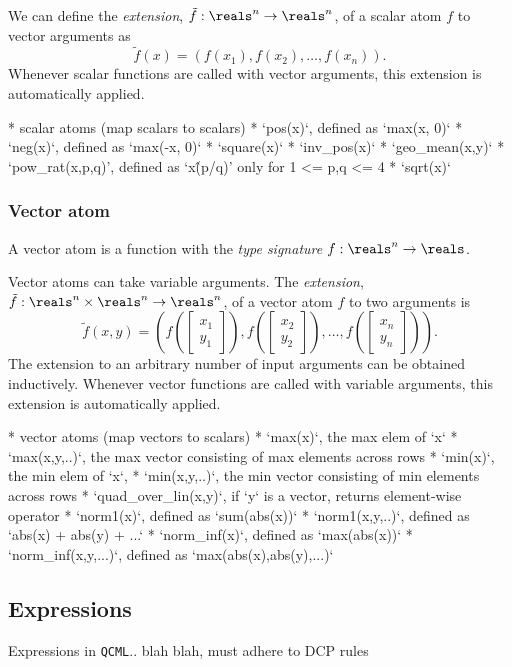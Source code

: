 \documentclass[11pt]{article}
\def\qcml{\texttt{QCML}\xspace}
\begin{document}
We can define the \emph{extension}, $\tilde f : \reals^n \to \reals^n$, 
of a scalar atom $f$ to vector arguments as
\[
\tilde f(x) = \left( f(x_1), f(x_2), \ldots, f(x_n) \right).
\]
Whenever scalar functions are called with vector arguments, this extension
is automatically applied.

* scalar atoms (map scalars to scalars)
  * `pos(x)`, defined as `max(x, 0)`
  * `neg(x)`, defined as `max(-x, 0)`
  * `square(x)`
  * `inv\_pos(x)`
  * `geo\_mean(x,y)`
  * `pow\_rat(x,p,q)', defined as `x\^(p/q)' only for 1 <= p,q <= 4
  * `sqrt(x)`

\subsubsection{Vector atom}
A vector atom is a function with the \emph{type signature} 
$f : \reals^n \to \reals$.

Vector atoms can take variable arguments. 
The \emph{extension}, $\tilde f : \reals^n \times \reals^n \to \reals^n$, of 
a vector atom $f$ to two arguments is
\[
\tilde f(x, y) = \left( f\left(\begin{bmatrix} x_1 \\ y_1 \end{bmatrix}\right), 
  f\left(\begin{bmatrix}x_2 \\ y_2 \end{bmatrix}\right), \ldots, 
  f\left(\begin{bmatrix}x_n \\ y_n\end{bmatrix}\right) \right).
\]
The extension to an arbitrary number of input arguments can be obtained inductively.
Whenever vector functions are called with variable arguments, this extension
is automatically applied.

* vector atoms (map vectors to scalars)
  * `max(x)`, the max elem of `x`
  * `max(x,y,..)`, the max vector consisting of max elements across rows
  * `min(x)`, the min elem of `x`,
  * `min(x,y,..)`, the min vector consisting of min elements across rows
  * `quad\_over\_lin(x,y)`, if `y` is a vector, returns element-wise operator
  * `norm1(x)`, defined as `sum(abs(x))`
  * `norm1(x,y,..)`, defined as `abs(x) + abs(y) + ...`
  * `norm\_inf(x)`, defined as `max(abs(x))`
  * `norm\_inf(x,y,...)`, defined as `max(abs(x),abs(y),...)`

\subsection{Expressions}
Expressions in \qcml.. blah blah, must adhere to DCP rules
\end{document}
